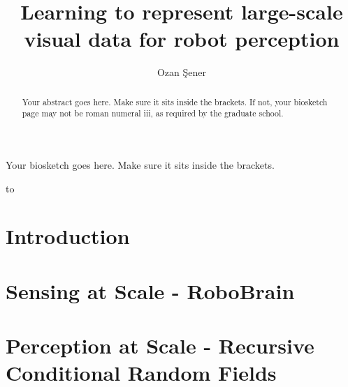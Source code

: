 \documentclass[phd,tocprelim]{cornell}
\title {Learning to represent large-scale visual data for robot perception}
\author {Ozan \c{S}ener}
\begin{document}
\maketitle
\makecopyright

\begin{abstract}
Your abstract goes here. Make sure it sits inside the brackets. If not,
your biosketch page may not be roman numeral iii, as required by the
graduate school.
\end{abstract}

\begin{biosketch}
Your biosketch goes here. Make sure it sits inside
the brackets.
\end{biosketch}

\begin{dedication}
to 
\end{dedication}

\begin{acknowledgements}
%
\end{acknowledgements}

\contentspage
\tablelistpage
\figurelistpage

\normalspacing \setcounter{page}{1} 
\pagestyle{cornell} \addtolength{\parskip}{0.5\baselineskip}

\chapter{Introduction}


\chapter{Sensing at Scale - RoboBrain}
%

\chapter{Perception at Scale - Recursive Conditional Random Fields}
\label{rcrf}
%
\end{document}
